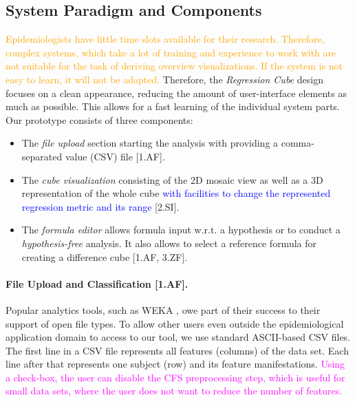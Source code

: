 \documentclass[journal]{style/vgtc} 			          %
\newcommand{\add}[1]{\textcolor{blue}{#1}}
\newcommand{\design}[1]{\textcolor{orange}{#1}}
\newcommand{\magenta}[1]{\textcolor{magenta}{#1}}
\begin{document}
\subsection{System Paradigm and Components}
\design{
Epidemiologists have little time slots available for their research.
Therefore, complex systems, which take a lot of training and experience to work with are not suitable for the task of deriving overview visualizations.
If the system is not easy to learn, it will not be adapted.
}
Therefore, the \emph{Regression Cube} design focuses on a clean appearance, reducing the amount of user-interface elements as much as possible.
This allows for a fast learning of the individual system parts.
Our prototype consists of three components:
\begin{itemize}
	\item The \emph{file upload} section starting the analysis with providing a comma-separated value (CSV) file [1.AF].
	\item The \emph{cube visualization} consisting of the 2D mosaic view as well as a 3D representation of the whole cube \add{with facilities to change the represented regression metric and its range} [2.SI].
	\item The \emph{formula editor} allows formula input w.r.t. a hypothesis or to conduct a \emph{hypothesis-free} analysis.
	It also allows to select a reference formula for creating a difference cube [1.AF, 3.ZF].
\end{itemize}
\paragraph{File Upload and Classification [1.AF].}
Popular analytics tools, such as WEKA \cite{WEKA}, owe part of their success to their support of open file types.
To allow other users even outside the epidemiological application domain to access to our tool, we use standard ASCII-based CSV files.
The first line in a CSV file represents all features (columns) of the data set.
Each line after that represents one subject (row) and its feature manifestations.
\magenta{Using a check-box, the user can disable the CFS preprocessing step, which is useful for small data sets, where the user does not want to reduce the number of features.}
\end{document}
